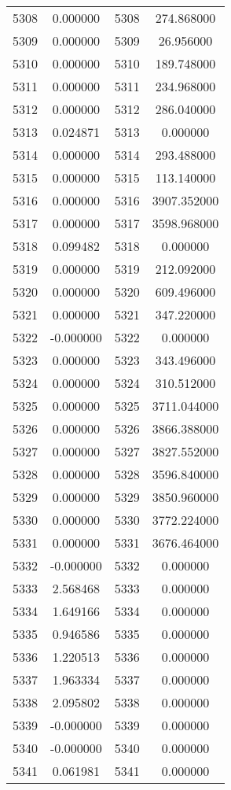\documentclass[12pt]{article}
\begin{document}
\begin{longtable}{@{}cccc@{}}
5308 & 0.000000 & 5308 & 274.868000 \\
5309 & 0.000000 & 5309 & 26.956000 \\
5310 & 0.000000 & 5310 & 189.748000 \\
5311 & 0.000000 & 5311 & 234.968000 \\
5312 & 0.000000 & 5312 & 286.040000 \\
5313 & 0.024871 & 5313 & 0.000000 \\
5314 & 0.000000 & 5314 & 293.488000 \\
5315 & 0.000000 & 5315 & 113.140000 \\
5316 & 0.000000 & 5316 & 3907.352000 \\
5317 & 0.000000 & 5317 & 3598.968000 \\
5318 & 0.099482 & 5318 & 0.000000 \\
5319 & 0.000000 & 5319 & 212.092000 \\
5320 & 0.000000 & 5320 & 609.496000 \\
5321 & 0.000000 & 5321 & 347.220000 \\
5322 & -0.000000 & 5322 & 0.000000 \\
5323 & 0.000000 & 5323 & 343.496000 \\
5324 & 0.000000 & 5324 & 310.512000 \\
5325 & 0.000000 & 5325 & 3711.044000 \\
5326 & 0.000000 & 5326 & 3866.388000 \\
5327 & 0.000000 & 5327 & 3827.552000 \\
5328 & 0.000000 & 5328 & 3596.840000 \\
5329 & 0.000000 & 5329 & 3850.960000 \\
5330 & 0.000000 & 5330 & 3772.224000 \\
5331 & 0.000000 & 5331 & 3676.464000 \\
5332 & -0.000000 & 5332 & 0.000000 \\
5333 & 2.568468 & 5333 & 0.000000 \\
5334 & 1.649166 & 5334 & 0.000000 \\
5335 & 0.946586 & 5335 & 0.000000 \\
5336 & 1.220513 & 5336 & 0.000000 \\
5337 & 1.963334 & 5337 & 0.000000 \\
5338 & 2.095802 & 5338 & 0.000000 \\
5339 & -0.000000 & 5339 & 0.000000 \\
5340 & -0.000000 & 5340 & 0.000000 \\
5341 & 0.061981 & 5341 & 0.000000 \\

\end{longtable}
\end{document}
